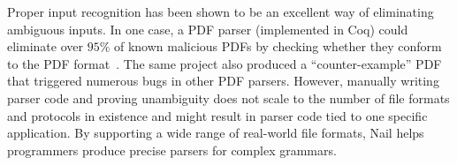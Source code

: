 

Proper input recognition has been shown to be an excellent way of
eliminating ambiguous inputs.  In one case, a PDF parser (implemented
in Coq) could eliminate over $95\%$ of known malicious PDFs by checking
whether they conform to the PDF format~\cite{Bogk-PDF}. The same project
also produced a ``counter-example'' PDF that triggered numerous bugs
in other PDF parsers. However, manually writing parser code and proving
unambiguity does not scale to the number of file formats and protocols
in existence and might result in parser code tied to one specific
application. By supporting a wide range of real-world file formats,
Nail helps programmers produce precise parsers for complex grammars.



